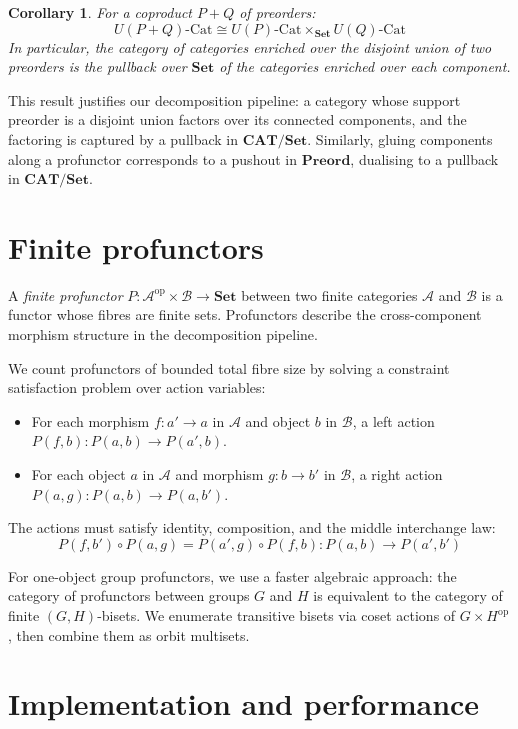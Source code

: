 \documentclass[12pt,a4paper]{amsart}
\newtheorem{corollary}[theorem]{Corollary}
\theoremstyle{definition}
\theoremstyle{remark}
\newcommand{\cat}{\mathcal}
\newcommand{\Set}{\mathbf{Set}}
\newcommand{\Preord}{\mathbf{Preord}}
\newcommand{\CAT}{\mathbf{CAT}}
\newcommand{\op}{\mathrm{op}}
\begin{document}
\begin{corollary}
  \label{cor:limits}
  For a coproduct $P + Q$ of preorders:
  \[
  U(P+Q)\text{-Cat} \cong U(P)\text{-Cat} \times_{\Set} U(Q)\text{-Cat}
  \]
  In particular, the category of categories enriched over the disjoint
  union of two preorders is the pullback over $\Set$ of the categories
  enriched over each component.
\end{corollary}

This result justifies our decomposition pipeline: a category whose support
preorder is a disjoint union factors over its connected components, and
the factoring is captured by a pullback in $\CAT/\Set$.  Similarly,
gluing components along a profunctor corresponds to a pushout in
$\Preord$, dualising to a pullback in $\CAT/\Set$.

\section{Finite profunctors}
\label{sec:profunctors}

A \emph{finite profunctor} $P : \cat{A}^{\op} \times \cat{B} \to \Set$
between two finite categories $\cat{A}$ and $\cat{B}$ is a functor whose
fibres are finite sets.  Profunctors describe the cross-component
morphism structure in the decomposition pipeline.

We count profunctors of bounded total fibre size by solving a constraint
satisfaction problem over action variables:

\begin{itemize}
\item For each morphism $f : a' \to a$ in $\cat{A}$ and object $b$ in
  $\cat{B}$, a left action $P(f,b) : P(a,b) \to P(a',b)$.
\item For each object $a$ in $\cat{A}$ and morphism $g : b \to b'$ in
  $\cat{B}$, a right action $P(a,g) : P(a,b) \to P(a,b')$.
\end{itemize}

The actions must satisfy identity, composition, and the middle interchange
law:
\[
P(f, b') \circ P(a, g) = P(a', g) \circ P(f, b) : P(a,b) \to P(a',b')
\]

For one-object group profunctors, we use a faster algebraic approach:
the category of profunctors between groups $G$ and $H$ is equivalent to
the category of finite $(G,H)$-bisets.  We enumerate transitive bisets
via coset actions of $G \times H^{\op}$, then combine them as orbit
multisets.

\section{Implementation and performance}
\label{sec:implementation}
\end{document}

